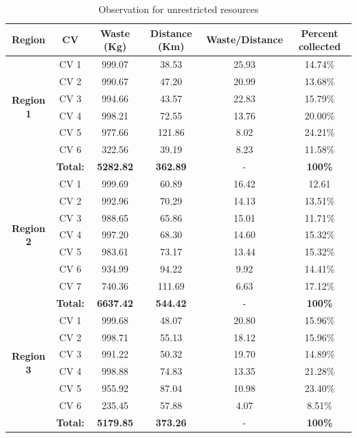 \documentclass[12pt]{article}
\begin{document}
\begin{table}[H]
    \centering
    \caption{Observation for unrestricted resources} \label{tab3}
    \vspace*{0.3cm}
    \begin{tabular}{|c|ccccc|}
    \hline
        \rowcolor{Gray1}\textbf{Region} & \textbf{CV} & \textbf{Waste (Kg)} & \textbf{Distance (Km)} & \textbf{Waste/Distance} & \textbf{Percent collected} \\
        \hline \multirow{6}{*}{\textbf{Region 1}} & CV 1 & 999.07& 38.53 & 25.93 &14.74\% \\
        & CV 2 & 990.67 & 47.20 & 20.99 & 13.68\%\\        
        & CV 3 & 994.66 & 43.57 & 22.83 & 15.79\%\\        
        & CV 4 & 998.21 & 72.55 & 13.76 & 20.00\%\\      
        & CV 5 & 977.66 & 121.86 & 8.02 & 24.21\%\\      
        & CV 6 & 322.56 & 39.19 & 8.23 & 11.58\%\\ 
        \hline\rowcolor{Gray2} &\textbf{Total:} &\textbf{5282.82} &\textbf{362.89} &- &\textbf{100\%}\\
        \hline \multirow{7}{*}{\textbf{Region 2}} & CV 1 & 999.69 & 60.89 & 16.42 & 12.61 \\
        & CV 2 & 992.96 & 70.29 & 14.13 & 13.51\%\\        
        & CV 3 & 988.65 & 65.86 & 15.01 & 11.71\%\\        
        & CV 4 & 997.20 & 68.30 & 14.60 & 15.32\%\\      
        & CV 5 & 983.61 & 73.17 & 13.44 & 15.32\%\\      
        & CV 6 & 934.99 & 94.22 & 9.92 & 14.41\%\\      
        & CV 7 & 740.36 & 111.69 & 6.63 & 17.12\%\\
        \hline\rowcolor{Gray2} &\textbf{Total:} &\textbf{6637.42} &\textbf{544.42} &- &\textbf{100\%}\\        
        \hline \multirow{6}{*}{\textbf{Region 3}} & CV 1 & 999.68 & 48.07 & 20.80 & 15.96\% \\
        & CV 2 & 998.71 & 55.13 & 18.12 & 15.96\%\\        
		& CV 3 & 991.22 & 50.32 & 19.70 & 14.89\%\\        
		& CV 4 & 998.88 & 74.83 & 13.35 & 21.28\%\\      
		& CV 5 & 955.92 & 87.04 & 10.98 & 23.40\%\\      
		& CV 6 & 235.45 & 57.88 & 4.07 & 8.51\%\\ 
        \hline\rowcolor{Gray2} &\textbf{Total:} &\textbf{5179.85} &\textbf{373.26 }&- &\textbf{100\%}\\
        \hline  
    \end{tabular}
\end{table}
\end{document}
